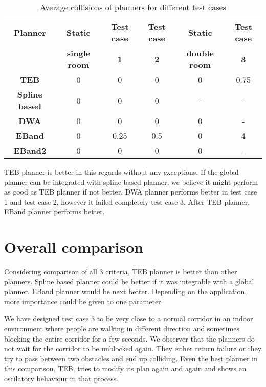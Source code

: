 \begin{table}[H]
    \centering
    \begin{tabular}{cccccc}\toprule
        \textbf{Planner} & \textbf{Static} & \textbf{Test case} & \textbf{Test case} & \textbf{Static} & \textbf{Test case} \\
                         & \textbf{single room} & \textbf{1} & \textbf{2} & \textbf{double room}       & \textbf{3} \\\toprule
        \textbf{TEB         } & 0 & 0 & 0 & 0 & 0.75 \\
        \textbf{Spline based} & 0 & 0 & 0 & \-- & \-- \\
        \textbf{DWA         } & 0 & 0 & 0 & 0 & \-- \\
        \textbf{EBand       } & 0 & 0.25 & 0.5 & 0 & 4 \\
        \textbf{EBand2      } & 0 & 0 & 0 & 0 & \-- \\
        \bottomrule
    \end{tabular}
    \caption{Average collisions of planners for different test cases}\label{tab:avg_collisions_planner_comp}
\end{table}

TEB planner is better in this regards without any exceptions. If the global planner can be integrated
with spline based planner, we believe it might perform as good as TEB planner if not better. DWA planner performs better in test 
case 1 and test case 2, however it failed completely test case 3. After TEB planner, 
EBand planner performs better. 

\section{Overall comparison}%
\label{sec:overall_comparison}

Considering comparison of all 3 criteria, TEB planner is better than other planners. Spline based 
planner could be better if it was integrable with a global planner. EBand planner would be next better.
Depending on the application, more importance could be given to one parameter.

We have designed test case 3 to be very close to a normal corridor in
an indoor environment where people are walking in different direction and sometimes blocking the entire
corridor for a few seconds. We observer that the planners do not wait for the corridor to be unblocked
again. They either return failure or they try to pass between two obstacles and end up colliding.
Even the best planner in this comparison, TEB, tries to modify its plan again and again and shows an
oscilatory behaviour in that process.

